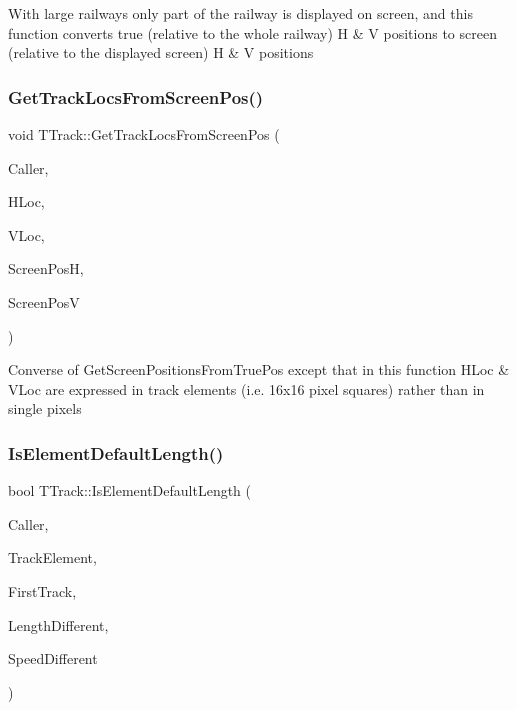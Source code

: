 With large railways only part of the railway is displayed on screen, and this function converts true (relative to the whole railway) H \& V positions to screen (relative to the displayed screen) H \& V positions \mbox{\label{class_t_track_ac57ebd0462a3e0d8323e7b5cbc0e20ca}} 
\subsubsection{\texorpdfstring{Get\+Track\+Locs\+From\+Screen\+Pos()}{GetTrackLocsFromScreenPos()}}
{\footnotesize\ttfamily void T\+Track\+::\+Get\+Track\+Locs\+From\+Screen\+Pos (\begin{DoxyParamCaption}\item[{int}]{Caller,  }\item[{int \&}]{H\+Loc,  }\item[{int \&}]{V\+Loc,  }\item[{int}]{Screen\+PosH,  }\item[{int}]{Screen\+PosV }\end{DoxyParamCaption})}

Converse of Get\+Screen\+Positions\+From\+True\+Pos except that in this function H\+Loc \& V\+Loc are expressed in track elements (i.\+e. 16x16 pixel squares) rather than in single pixels \mbox{\label{class_t_track_a9519d6fa40b71bfcad4d5383634d73dd}} 
\subsubsection{\texorpdfstring{Is\+Element\+Default\+Length()}{IsElementDefaultLength()}}
{\footnotesize\ttfamily bool T\+Track\+::\+Is\+Element\+Default\+Length (\begin{DoxyParamCaption}\item[{int}]{Caller,  }\item[{\mbox{\hyperlink{class_t_track_element}{T\+Track\+Element}} \&}]{Track\+Element,  }\item[{bool}]{First\+Track,  }\item[{bool \&}]{Length\+Different,  }\item[{bool \&}]{Speed\+Different }\end{DoxyParamCaption})}

